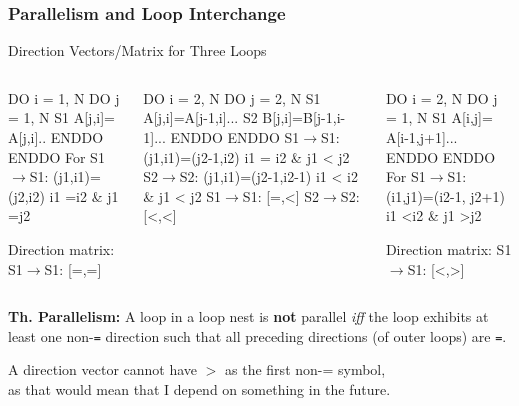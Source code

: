 \documentclass[rgb,dvipsnames]{beamer}
\newcommand{\emp}[1]{\textcolor{DikuRed}{ #1}}
\newcommand{\mymath}[1]{$ #1 $}
\begin{document}
\begin{frame}[fragile,t]
  \frametitle{Parallelism and Loop Interchange} %

\begin{block}{Direction Vectors/Matrix for Three Loops }
\begin{columns}
\begin{colorcode}
  DO i = 1, N
    DO j = 1, N
S1    A[j,i]=
       A[j,i]..
    ENDDO
  ENDDO\pause
For S1\mymath{\rightarrow}S1: 
 (j1,i1)=(j2,i2) 
 i1\emp{=}i2 \& j1\emp{=}j2

Direction matrix:
S1\mymath{\rightarrow}S1: \emp{[=,=]}
\end{colorcode}
\begin{colorcode}
  DO i = 2, N
   DO j = 2, N
S1  A[j,i]=A[j-1,i]...
S2  B[j,i]=B[j-1,i-1]...
   ENDDO
  ENDDO\pause
S1\mymath{\rightarrow}S1: (j1,i1)=(j2-1,i2)
        i1 \emp{=} i2 \& j1 \emp{<} j2
S2\mymath{\rightarrow}S2: (j1,i1)=(j2-1,i2-1)
        i1 \emp{<} i2 \& j1 \emp{<} j2
S1\mymath{\rightarrow}S1: \emp{[=,<]}
S2\mymath{\rightarrow}S2: \emp{[<,<]}
\end{colorcode}
\begin{colorcode}
  DO i = 2, N
   DO j = 1, N
S1  A[i,j]=
     A[i-1,j+1]...
   ENDDO
  ENDDO
For S1\mymath{\rightarrow}S1:\pause
 (i1,j1)=(i2-1,
          j2+1)
 i1\emp{<}i2 \& j1\emp{>}j2

Direction matrix:
S1\mymath{\rightarrow}S1: \emp{[<,>]}
\end{colorcode}
\end{columns}
\end{block} 

{\bf Th. Parallelism:} A loop in a loop nest is {\bf not} parallel {\em iff} the loop 
exhibits at least one non-{\tt{}=} direction such that all preceding directions 
(of outer loops) are {\tt =}.

\smallskip

\alert{A direction vector cannot have $>$ as the first non-= symbol},\\
as that would mean that I depend on something in the future. 
\end{frame}
\end{document}
